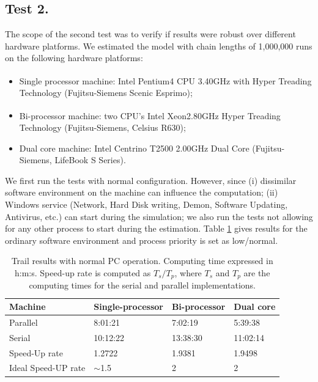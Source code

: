 \documentclass[12pt,a4paper,pdftex]{article}
\begin{document}
\subsection{Test 2.}\label{s:test2}
The scope of the second test was to verify if results were robust over different hardware platforms.
We estimated the model with chain lengths of 1,000,000 runs on the following hardware platforms:
\begin{itemize}
\item Single processor machine: Intel\textsuperscript{\textregistered} Pentium4\textsuperscript{\textregistered} CPU 3.40GHz with Hyper Treading Technology (Fujitsu-Siemens Scenic Esprimo);
\item Bi-processor machine: two CPU's Intel\textsuperscript{\textregistered} Xeon\texttrademark 2.80GHz Hyper Treading Technology (Fujitsu-Siemens, Celsius R630);
\item Dual core machine: Intel Centrino T2500 2.00GHz Dual Core  (Fujitsu-Siemens, LifeBook S Series).
\end{itemize}

We first run the tests with normal configuration. However, since (i) dissimilar software environment on the machine can influence the computation; (ii) Windows service (Network, Hard Disk writing, Demon, Software Updating, Antivirus, etc.) can start during the simulation; we also run the tests not allowing for any other process to start during the estimation. Table \ref{tab:trail} gives results for the ordinary software environment and process priority is set as low/normal.

\begin{table}
\begin{centering}
\begin{tabular}{l|l|l|l}
Machine	& Single-processor	& Bi-processor	& Dual core \\ \hline
Parallel & 8:01:21 & 7:02:19 & 5:39:38 \\
Serial & 10:12:22 & 13:38:30 & 11:02:14 \\
Speed-Up rate & 1.2722 & 1.9381 & 1.9498\\
Ideal Speed-UP rate &  $\sim$1.5 & 2 & 2 \\
  \hline
\end{tabular}
\caption{Trail results with normal PC operation. Computing time expressed in h:m:s. Speed-up rate is computed as $T_s/T_p$, where $T_s$ and $T_p$ are the computing times for the serial and parallel implementations.}\label{tab:trail}
\end{centering}
\end{table}
\end{document}
